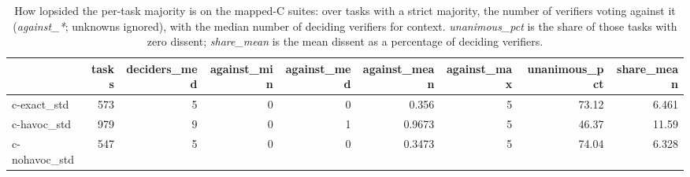 \begin{table}[t]
  \centering
  \caption{How lopsided the per-task majority is on the mapped-C suites: over tasks with a strict majority, the number of verifiers voting against it (\emph{against\_*}; unknowns ignored), with the median number of deciding verifiers for context. \emph{unanimous\_pct} is the share of those tasks with zero dissent; \emph{share\_mean} is the mean dissent as a percentage of deciding verifiers.}
  \label{tab:majority-strength}
\begin{tabular}{lrrrrrrrr}
\toprule
 & tasks & deciders\_med & against\_min & against\_med & against\_mean & against\_max & unanimous\_pct & share\_mean \\
\midrule
c-exact\_std & 573 & 5 & 0 & 0 & 0.356 & 5 & 73.12 & 6.461 \\
c-havoc\_std & 979 & 9 & 0 & 1 & 0.9673 & 5 & 46.37 & 11.59 \\
c-nohavoc\_std & 547 & 5 & 0 & 0 & 0.3473 & 5 & 74.04 & 6.328 \\
\bottomrule
\end{tabular}
\end{table}
